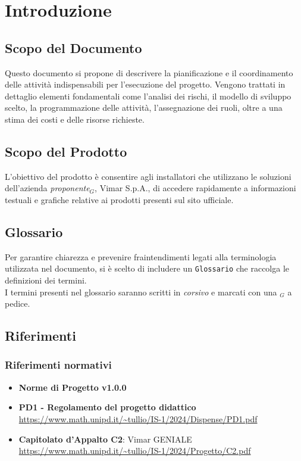 \section{Introduzione}
\subsection{Scopo del Documento}
Questo documento si propone di descrivere la pianificazione e il coordinamento delle attività indispensabili per l'esecuzione del progetto. Vengono trattati in dettaglio elementi fondamentali come l'analisi dei rischi, il modello di sviluppo scelto, la programmazione delle attività, l'assegnazione dei ruoli, oltre a una stima dei costi e delle risorse richieste.
\subsection{Scopo del Prodotto} 
L'obiettivo del prodotto è consentire agli installatori che utilizzano le soluzioni dell'azienda \textit{proponente$_G$}, Vimar S.p.A., di accedere rapidamente a informazioni testuali e grafiche relative ai prodotti presenti sul sito ufficiale.
\subsection{Glossario}
Per garantire chiarezza e prevenire fraintendimenti legati alla terminologia utilizzata nel documento, si è scelto di includere un \texttt{Glossario} che raccolga le definizioni dei termini.\\ I termini presenti nel glossario saranno scritti in \textit{corsivo} e marcati con una $_G$ a pedice.
\subsection{Riferimenti}
\subsubsection{Riferimenti  normativi}  
\begin{itemize}
    \item \textbf{Norme di Progetto v1.0.0}
    \item \textbf{PD1 - Regolamento del progetto didattico} \\
    \url{https://www.math.unipd.it/~tullio/IS-1/2024/Dispense/PD1.pdf} 
    \item \textbf{Capitolato d'Appalto C2}: Vimar GENIALE \\
    \url{https://www.math.unipd.it/~tullio/IS-1/2024/Progetto/C2.pdf}
\end{itemize}
